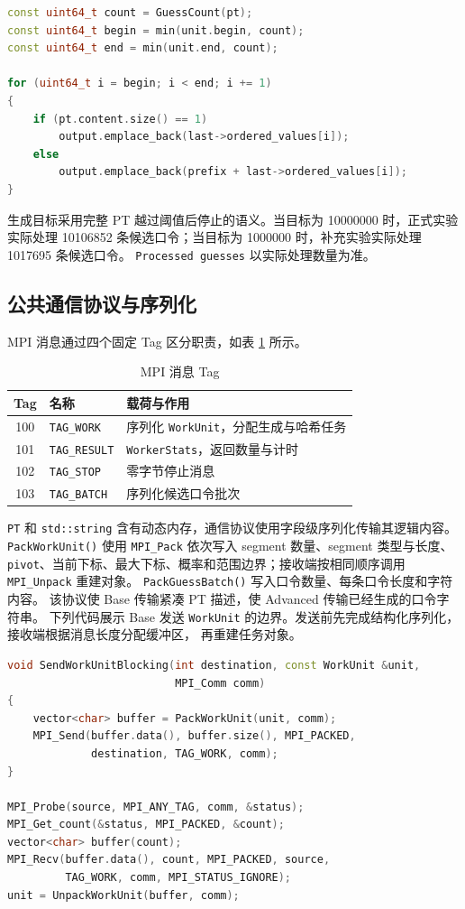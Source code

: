 \documentclass[UTF8,a4paper,12pt]{ctexart}
\newcommand{\code}[1]{\texttt{#1}}
\begin{document}
\begin{lstlisting}[language=C++]
const uint64_t count = GuessCount(pt);
const uint64_t begin = min(unit.begin, count);
const uint64_t end = min(unit.end, count);

for (uint64_t i = begin; i < end; i += 1)
{
    if (pt.content.size() == 1)
        output.emplace_back(last->ordered_values[i]);
    else
        output.emplace_back(prefix + last->ordered_values[i]);
}
\end{lstlisting}

生成目标采用完整 PT 越过阈值后停止的语义。当目标为 10000000 时，正式实验实际处理
10106852 条候选口令；当目标为 1000000 时，补充实验实际处理 1017695 条候选口令。
\code{Processed guesses} 以实际处理数量为准。

\subsection{公共通信协议与序列化}

MPI 消息通过四个固定 Tag 区分职责，如表 \ref{tab:message-tags} 所示。

\begin{table}[H]
  \centering
  \caption{MPI 消息 Tag}
  \label{tab:message-tags}
  \begin{tabular}{cll}
    \toprule
    Tag & 名称 & 载荷与作用 \\
    \midrule
    100 & \code{TAG\_WORK} & 序列化 \code{WorkUnit}，分配生成与哈希任务 \\
    101 & \code{TAG\_RESULT} & \code{WorkerStats}，返回数量与计时 \\
    102 & \code{TAG\_STOP} & 零字节停止消息 \\
    103 & \code{TAG\_BATCH} & 序列化候选口令批次 \\
    \bottomrule
  \end{tabular}
\end{table}

\code{PT} 和 \code{std::string} 含有动态内存，通信协议使用字段级序列化传输其逻辑内容。
\code{PackWorkUnit()} 使用 \code{MPI\_Pack} 依次写入 segment 数量、segment 类型与长度、
\code{pivot}、当前下标、最大下标、概率和范围边界；接收端按相同顺序调用
\code{MPI\_Unpack} 重建对象。
\code{PackGuessBatch()} 写入口令数量、每条口令长度和字符内容。
该协议使 Base 传输紧凑 PT 描述，使 Advanced 传输已经生成的口令字符串。
下列代码展示 Base 发送 \code{WorkUnit} 的边界。发送前先完成结构化序列化，接收端根据消息长度分配缓冲区，
再重建任务对象。

\begin{lstlisting}[language=C++]
void SendWorkUnitBlocking(int destination, const WorkUnit &unit,
                          MPI_Comm comm)
{
    vector<char> buffer = PackWorkUnit(unit, comm);
    MPI_Send(buffer.data(), buffer.size(), MPI_PACKED,
             destination, TAG_WORK, comm);
}

MPI_Probe(source, MPI_ANY_TAG, comm, &status);
MPI_Get_count(&status, MPI_PACKED, &count);
vector<char> buffer(count);
MPI_Recv(buffer.data(), count, MPI_PACKED, source,
         TAG_WORK, comm, MPI_STATUS_IGNORE);
unit = UnpackWorkUnit(buffer, comm);
\end{lstlisting}
\end{document}
